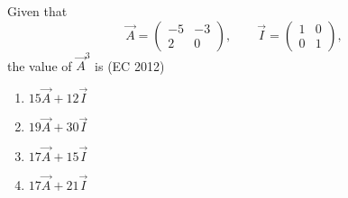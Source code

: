\item Given that
\[
\vec{A} = \begin{pmatrix}-5 & -3\\ 2 & 0\end{pmatrix}, \qquad
\vec{I} = \begin{pmatrix}1 & 0\\ 0 & 1\end{pmatrix},
\]
the value of $\vec{A}^{3}$ is
\hfill {(EC 2012)}
\begin{multicols}{4}
    \begin{enumerate}
        \item $15\vec{A} + 12\vec{I}$
        \item $19\vec{A} + 30\vec{I}$
        \item $17\vec{A} + 15\vec{I}$
        \item $17\vec{A} + 21\vec{I}$
    \end{enumerate}
\end{multicols}

